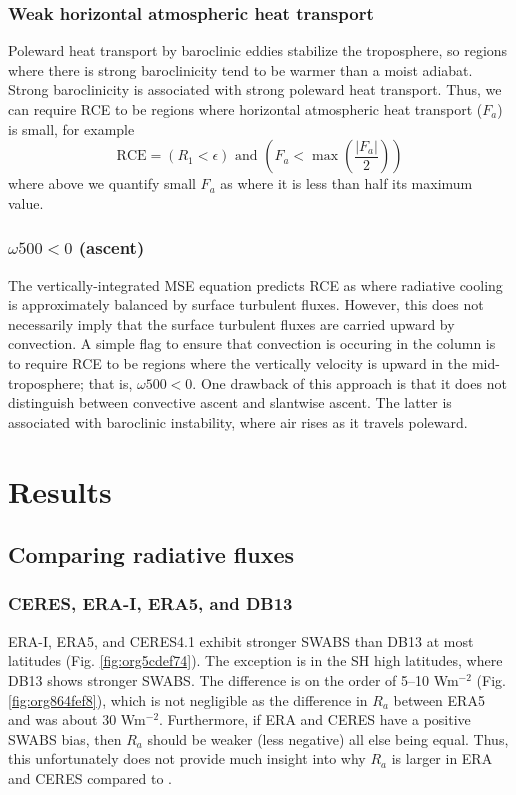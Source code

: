 \documentclass[11pt]{article}
\begin{document}
\subsubsection{Weak horizontal atmospheric heat transport}
\label{sec:org4370cc0}
Poleward heat transport by baroclinic eddies stabilize the troposphere, so regions where there is strong baroclinicity tend to be warmer than a moist adiabat. Strong baroclinicity is associated with strong poleward heat transport. Thus, we can require RCE to be regions where horizontal atmospheric heat transport (\(F_a\)) is small, for example
\begin{equation}
    \mathrm{RCE} = (R_1 < \epsilon) \text{ and } \left(F_a < \max\left(\frac{|F_a|}{2}\right)\right)
\end{equation}
where above we quantify small \(F_a\) as where it is less than half its maximum value.
\subsubsection{\(\omega500<0\) (ascent)}
\label{sec:org55f55ff}
The vertically-integrated MSE equation predicts RCE as where radiative cooling is approximately balanced by surface turbulent fluxes. However, this does not necessarily imply that the surface turbulent fluxes are carried upward by convection. A simple flag to ensure that convection is occuring in the column is to require RCE to be regions where the vertically velocity is upward in the mid-troposphere; that is, \(\omega500<0\). One drawback of this approach is that it does not distinguish between convective ascent and slantwise ascent. The latter is associated with baroclinic instability, where air rises as it travels poleward.
\section{Results}
\label{sec:orga0cd988}
\subsection{Comparing radiative fluxes}
\label{sec:org95eef24}
\subsubsection{CERES, ERA-I, ERA5, and DB13}
\label{sec:orgb10be3e}
ERA-I, ERA5, and CERES4.1 exhibit stronger SWABS than DB13 at most latitudes (Fig. \ref{fig:org5cdef74}). The exception is in the SH high latitudes, where DB13 shows stronger SWABS. The difference is on the order of 5--10 Wm\(^{-2}\) (Fig. \ref{fig:org864fef8}), which is not negligible as the difference in \(R_a\) between ERA5 and \cite{hartmann_global_2016} was about 30 Wm\(^{-2}\). Furthermore, if ERA and CERES have a positive SWABS bias, then \(R_a\) should be weaker (less negative) all else being equal. Thus, this unfortunately does not provide much insight into why \(R_a\) is larger in ERA and CERES compared to \cite{hartmann_global_2016}.
\end{document}
